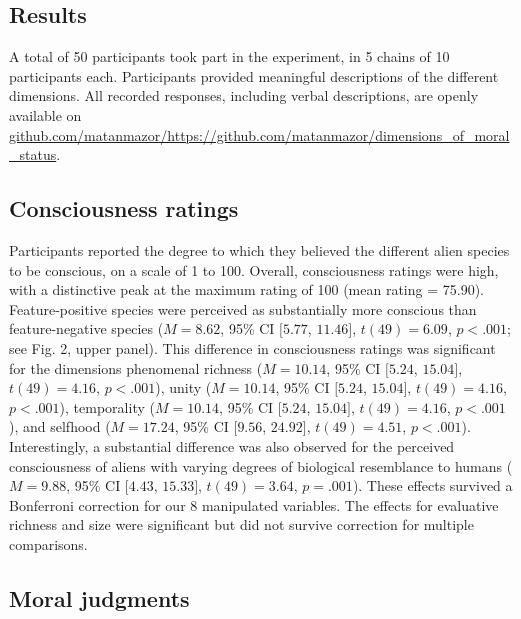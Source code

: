 \documentclass[10pt, letterpaper]{article}
\begin{document}
\hypertarget{results}{%
\subsection{Results}\label{results}}

A total of 50 participants took part in the experiment, in 5 chains of
10 participants each. Participants provided meaningful descriptions of
the different dimensions. All recorded responses, including verbal
descriptions, are openly available on
\url{github.com/matanmazor/https://github.com/matanmazor/dimensions_of_moral_status}.

\hypertarget{consciousness-ratings}{%
\subsection{Consciousness ratings}\label{consciousness-ratings}}

Participants reported the degree to which they believed the different
alien species to be conscious, on a scale of 1 to 100. Overall,
consciousness ratings were high, with a distinctive peak at the maximum
rating of 100 (mean rating = 75.90). Feature-positive species were
perceived as substantially more conscious than feature-negative species
(\(M = 8.62\), 95\% CI \([5.77\), \(11.46]\), \(t(49) = 6.09\),
\(p < .001\); see Fig. 2, upper panel). This difference in consciousness
ratings was significant for the dimensions phenomenal richness
(\(M = 10.14\), 95\% CI \([5.24\), \(15.04]\), \(t(49) = 4.16\),
\(p < .001\)), unity (\(M = 10.14\), 95\% CI \([5.24\), \(15.04]\),
\(t(49) = 4.16\), \(p < .001\)), temporality (\(M = 10.14\), 95\% CI
\([5.24\), \(15.04]\), \(t(49) = 4.16\), \(p < .001\)), and selfhood
(\(M = 17.24\), 95\% CI \([9.56\), \(24.92]\), \(t(49) = 4.51\),
\(p < .001\)). Interestingly, a substantial difference was also observed
for the perceived consciousness of aliens with varying degrees of
biological resemblance to humans (\(M = 9.88\), 95\% CI \([4.43\),
\(15.33]\), \(t(49) = 3.64\), \(p = .001\)). These effects survived a
Bonferroni correction for our 8 manipulated variables. The effects for
evaluative richness and size were significant but did not survive
correction for multiple comparisons.

\hypertarget{moral-judgments}{%
\subsection{Moral judgments}\label{moral-judgments}}
\end{document}
